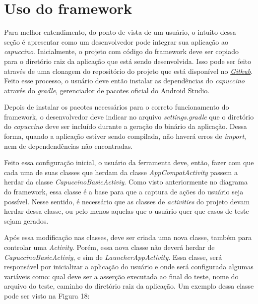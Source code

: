 \documentclass[
    12pt,       %
    openright,      %
    twoside,      %
    a4paper,      %
    english,      %
    french,       %
    spanish,      %
    brazil,       %
    ]{abntex2}
\begin{document}
      \section{Uso do framework}
        Para melhor entendimento, do ponto de vista de um usuário, o intuito dessa seção é apresentar como um
        desenvolvedor pode integrar sua aplicação ao \textit{capuccino}. Inicialmente, o projeto com código
        do framework deve ser copiado para o diretório raiz da aplicação que está sendo desenvolvida. Isso pode
        ser feito através de uma clonagem do repositório do projeto que está disponível no
        \href{https://github.com/olegario96/capuccino}{\textit{Github}}. Feito esse processo, o
        usuário deve então instalar as dependências do \textit{capuccino} através do \textit{gradle}, gerenciador
        de pacotes oficial do Android Studio.

        Depois de instalar os pacotes necessários para o correto funcionamento do framework, o desenvolvedor
        deve indicar no arquivo \textit{settings.gradle} que o diretório do \textit{capuccino} deve ser
        incluído durante a geração do binário da aplicação. Dessa forma, quando a aplicação estiver sendo
        compilada, não haverá erros de \textit{import}, nem de dependendências não encontradas.

        Feito essa configuração inicial, o usuário da ferramenta deve, então, fazer com que cada uma de suas
        classes que herdam da classe \textit{AppCompatActivity} passem a herdar da classe
        \textit{CapuccinoBasicActiviy}. Como visto anteriormente no diagrama do framework, essa classe é
        a base para que a captura de ações do usuário seja possível. Nesse sentido, é necessário que as
        classes de \textit{activities} do projeto devam herdar dessa classe, ou pelo menos aquelas que o
        usuário quer que casos de teste sejam gerados.

        Após essa modificação nas classes, deve ser criada uma nova classe, também para controlar uma
        \textit{Activity}. Porém, essa nova classe não deverá herdar de \textit{CapuccinoBasicActiviy},
        e sim de \textit{LauncherAppActivity}. Essa classe, será responsável por inicializar a aplicação
        do usuário e onde será configurada algumas variáveis como: qual deve ser a asserção executada ao
        final do teste, nome do arquivo do teste, caminho do diretório raiz da aplicação. Um exemplo
        dessa classe pode ser visto na Figura 18:
\end{document}
